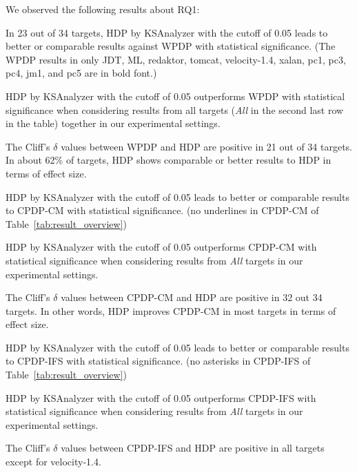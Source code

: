We observed the following results about RQ1:
\squishlist
	\item In 23 out of 34 targets, HDP by KSAnalyzer with the cutoff of
	0.05 leads to better or comparable results against WPDP with statistical
	significance. (The WPDP results in only JDT, ML, redaktor, tomcat, velocity-1.4, xalan, pc1, pc3, pc4, jm1, and pc5 are in bold font.)
	\item HDP by KSAnalyzer with the cutoff of 0.05 outperforms
	WPDP with statistical significance when considering
	results from all targets ({\em All} in the second last row in the table) together in
	our experimental settings.
	\item The Cliff's $\delta$ values between WPDP and HDP are positive in 21 out of 34 targets. In about 62\% of targets, HDP shows comparable or better results to HDP in terms of effect size.
	\item HDP by KSAnalyzer with the cutoff of 0.05
	leads to better or comparable results to CPDP-CM
	with statistical significance. (no underlines in CPDP-CM of
	Table~\ref{tab:result_overview})
	\item HDP by KSAnalyzer with the cutoff of 0.05 outperforms
	CPDP-CM with statistical significance
	when considering results from {\em All} targets in our experimental
	settings.
	\item The Cliff's $\delta$ values between CPDP-CM and HDP are positive in 32 out 34 targets. In other words, HDP improves CPDP-CM in most targets in terms of effect size.
	\item HDP by KSAnalyzer with the cutoff of 0.05
	leads to better or comparable results to CPDP-IFS with
	statistical significance. (no asterisks in CPDP-IFS of
	Table~\ref{tab:result_overview})
	\item HDP by KSAnalyzer with the cutoff of 0.05 outperforms
	CPDP-IFS with statistical significance
	when considering results from {\em All} targets in our experimental
	settings.
	\item The Cliff's $\delta$ values between CPDP-IFS and HDP are positive in all targets except for velocity-1.4.
\squishend

